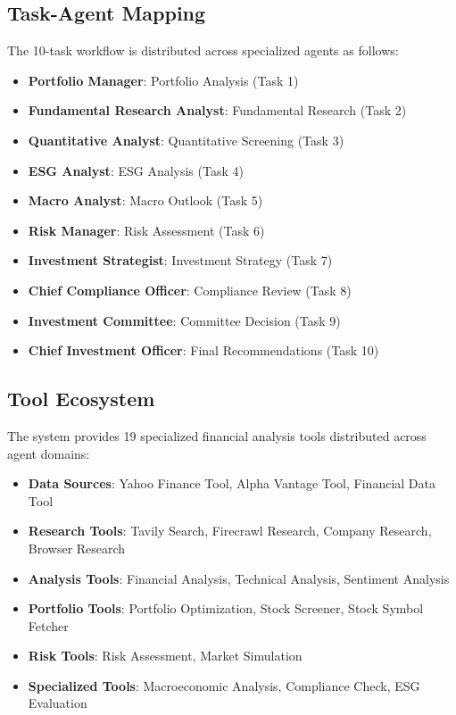 \documentclass[11pt,a4paper]{article}
\begin{document}
\subsection{Task-Agent Mapping}
The 10-task workflow is distributed across specialized agents as follows:
\begin{itemize}
    \item \textbf{Portfolio Manager}: Portfolio Analysis (Task 1)
    \item \textbf{Fundamental Research Analyst}: Fundamental Research (Task 2)
    \item \textbf{Quantitative Analyst}: Quantitative Screening (Task 3)
    \item \textbf{ESG Analyst}: ESG Analysis (Task 4)
    \item \textbf{Macro Analyst}: Macro Outlook (Task 5)
    \item \textbf{Risk Manager}: Risk Assessment (Task 6)
    \item \textbf{Investment Strategist}: Investment Strategy (Task 7)
    \item \textbf{Chief Compliance Officer}: Compliance Review (Task 8)
    \item \textbf{Investment Committee}: Committee Decision (Task 9)
    \item \textbf{Chief Investment Officer}: Final Recommendations (Task 10)
\end{itemize}

\subsection{Tool Ecosystem}
The system provides 19 specialized financial analysis tools distributed across agent domains:
\begin{itemize}
    \item \textbf{Data Sources}: Yahoo Finance Tool, Alpha Vantage Tool, Financial Data Tool
    \item \textbf{Research Tools}: Tavily Search, Firecrawl Research, Company Research, Browser Research
    \item \textbf{Analysis Tools}: Financial Analysis, Technical Analysis, Sentiment Analysis
    \item \textbf{Portfolio Tools}: Portfolio Optimization, Stock Screener, Stock Symbol Fetcher
    \item \textbf{Risk Tools}: Risk Assessment, Market Simulation
    \item \textbf{Specialized Tools}: Macroeconomic Analysis, Compliance Check, ESG Evaluation
\end{itemize}
\end{document}
